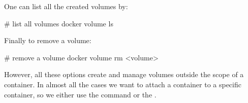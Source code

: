 One can list all the created volumes by:

\begin{bash}
# list all volumes
docker volume ls
\end{bash}

Finally to remove a volume:

\begin{bash}
# remove a volume
docker volume rm <volume>
\end{bash}

However, all these options create and manage volumes outside the scope of a container. In almost all the cases we
want to attach a container to a specific container, so we either use the  command or the
.

\newpage